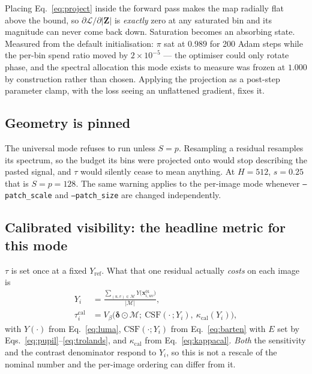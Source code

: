 \documentclass[11pt,a4paper]{article}
\begin{document}
Placing Eq.~\eqref{eq:project} inside the forward pass makes the map
radially flat above the bound, so $\partial\mathcal{L}/\partial|\mathbf{Z}|$
is \emph{exactly} zero at any saturated bin and its magnitude can never come
back down. Saturation becomes an absorbing state. Measured from the default
initialisation: $\pi$ sat at $0.989$ for 200 Adam steps while the per-bin
spend ratio moved by $2\times10^{-5}$ --- the optimiser could only rotate
phase, and the spectral allocation this mode exists to measure was frozen at
$1.000$ by construction rather than chosen. Applying the projection as a
post-step parameter clamp, with the loss seeing an unflattened gradient,
fixes it.

\subsection{Geometry is pinned}

The universal mode refuses to run unless $S=p$. Resampling a residual
resamples its spectrum, so the budget its bins were projected onto would
stop describing the pasted signal, and $\tau$ would silently cease to mean
anything. At $H=512$, $s=0.25$ that is $S=p=128$. The same warning applies
to the per-image mode whenever \texttt{--patch\_scale} and
\texttt{--patch\_size} are changed independently.

\subsection{Calibrated visibility: the headline metric for this mode}

$\tau$ is set once at a fixed $Y_{\mathrm{ref}}$. What that one residual
actually \emph{costs} on each image is
\begin{align}
  Y_i &= \frac{\sum_{(u,v)\in\mathcal{M}} Y\big(\mathbf{x}^{01}_{i,uv}\big)}
              {|\mathcal{M}|}, \label{eq:Yi}\\
  \tau^{\mathrm{cal}}_i &= V_\beta\Big(\boldsymbol{\delta}\odot\mathcal{M};\
     \mathrm{CSF}(\cdot\,;Y_i),\ \kappa_{\mathrm{cal}}(Y_i)\Big),
  \label{eq:taucal}
\end{align}
with $Y(\cdot)$ from Eq.~\eqref{eq:luma}, $\mathrm{CSF}(\cdot;Y_i)$ from
Eq.~\eqref{eq:barten} with $E$ set by
Eqs.~\eqref{eq:pupil}--\eqref{eq:trolands}, and $\kappa_{\mathrm{cal}}$ from
Eq.~\eqref{eq:kappacal}. \emph{Both} the sensitivity and the contrast
denominator respond to $Y_i$, so this is not a rescale of the nominal number
and the per-image ordering can differ from it.
\end{document}
